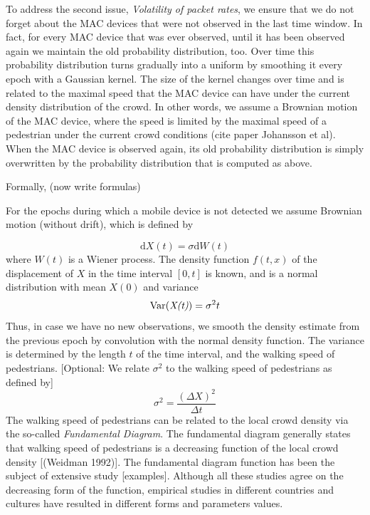 \documentclass[10pt,a4paper]{article}
\begin{document}
To address the second issue, {\it Volatility of packet rates}, we ensure that we do not forget about the MAC devices that were not observed in the last time window. In fact, for every MAC device that was ever observed, until it has been observed again we maintain the old probability distribution, too. Over time this probability distribution turns gradually into a uniform by smoothing it every epoch with a Gaussian kernel. The size of the kernel changes over time and is related to the maximal speed that the MAC device can have under the current density distribution of the crowd. In other words, we assume a Brownian motion of the MAC device, where the speed is limited by the maximal speed of a pedestrian under the current crowd conditions (cite paper Johansson et al). When the MAC device is observed again, its old probability distribution is simply overwritten by the probability distribution that is computed as above. 

Formally,  (now write formulas) 

For the epochs during which a mobile device is not detected we assume Brownian motion (without drift), which is defined by

\begin{equation}
\text{d}X(t)=\sigma\text{d}W(t)
\end{equation}
where $W(t)$ is a Wiener process. The density function $f(t,x)$ of the displacement of $X$ in the time interval $[0,t]$ is known, and is a normal distribution with mean $X(0)$ and variance
\begin{equation}
\text{Var(\textit{X(t)})}=\sigma^{2}t
\end{equation}
Thus, in case we have no new observations, we smooth the density estimate from the previous epoch by convolution with the normal density function. 
The variance is determined by the length $t$ of the time interval, and the walking speed of pedestrians.
[Optional: We relate $\sigma^2$ to the walking speed of pedestrians as defined by]
\begin{equation}
\sigma^2=\frac{(\Delta X)^2}{\Delta t}
\end{equation}
The walking speed of pedestrians can be related to the local crowd density via the so-called \textit{Fundamental Diagram}. 
The fundamental diagram generally states that walking speed of pedestrians is a decreasing function of the local crowd density [(Weidman 1992)].
The fundamental diagram function has been the subject of extensive study [examples].
Although all these studies agree on the decreasing form of the function, empirical studies in different countries and cultures have resulted in different forms and parameters values.
\end{document}
